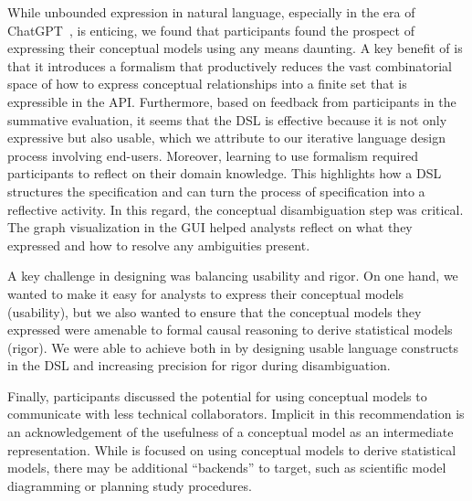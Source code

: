 
While unbounded expression in natural language, especially in the era of
ChatGPT~\cite{brown2020language}, is enticing, we found that participants found
the prospect of expressing their conceptual models using any means daunting. A
key benefit of \rTisane is that it introduces a formalism that productively
reduces the vast combinatorial space of how to express conceptual
relationships into a finite set that is expressible in the API. Furthermore,
based on feedback from participants in the summative evaluation, it seems that
the DSL is effective because it is not only expressive but also usable, which we
attribute to our iterative language design process involving end-users.
Moreover, learning to use \rTisanes formalism required participants to reflect
on their domain knowledge. This highlights how a DSL structures the
specification and can turn the process of specification into a reflective
activity. In this regard, the conceptual disambiguation step was critical. The
graph visualization in the GUI helped analysts reflect on what they expressed
and how to resolve any ambiguities present. 


A key challenge in designing \rTisane was balancing usability and rigor. On one
hand, we wanted to make it easy for analysts to express their conceptual models
(usability), but we also wanted to ensure that the conceptual models they
expressed were amenable to formal causal reasoning to derive statistical models
(rigor). We were able to achieve both in \rTisane by designing usable language
constructs in the DSL and increasing precision for rigor during disambiguation.

Finally, participants discussed the potential for using conceptual models to
communicate with less technical collaborators. Implicit in this recommendation
is an acknowledgement of the usefulness of a conceptual model as an intermediate
representation. While \rTisane is focused on using conceptual models to derive
statistical models, there may be additional ``backends'' to target, such as
scientific model diagramming or planning study procedures. 

